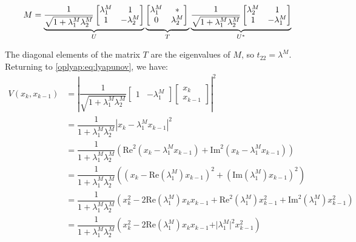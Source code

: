 \documentclass[a4paper,11pt]{article}
\begin{document}
\begin{equation}
 \label{oplyap:eq:schur_decomposition_ex}
 M = 
\underbrace{\dfrac{1}{\sqrt{1 + \lambda^M_1\lambda^M_2}}\begin{bmatrix} \lambda^M_1 & 1 \\ 1 & -\lambda^M_2 \end{bmatrix} }_{U}
\underbrace{\begin{bmatrix} \lambda^M_1 & * \\ 0 & \lambda^M_2 \end{bmatrix}\vphantom{\dfrac{1}{\sqrt{1 + \lambda^M_1\lambda^M_2}}}}_T
\underbrace{\dfrac{1}{\sqrt{1 + \lambda^M_1\lambda^M_2}}\begin{bmatrix} \lambda^M_2 & 1 \\ 1 & -\lambda^M_1 \end{bmatrix}}_{U^*}
\end{equation}

The diagonal elements of the matrix $T$ are the eigenvalues of $M$, so $t_{22} = \lambda^M$. Returning to \eqref{oplyap:eq:lyapunov}, we have:
\begin{equation}
 \begin{split}
 V(x_{k}, x_{k-1}) &= \left\vert \dfrac{1}{\sqrt{1 + \lambda^M_1\lambda^M_2}}\begin{bmatrix} 1 & -\lambda^M_1 \end{bmatrix} \begin{bmatrix} x_k \\ x_{k-1} \end{bmatrix} \right\vert^2 \\
 &= \dfrac{1}{1 + \lambda^M_1\lambda^M_2} \left\vert x_k - \lambda^M_1 x_{k-1}\right\vert^2 \\
 &= \dfrac{1}{1 + \lambda^M_1\lambda^M_2} \left(\text{Re}^2(x_k - \lambda^M_1 x_{k-1}) + \text{Im}^2(x_k - \lambda^M_1x_{k-1}) \right) \\
 &= \dfrac{1}{1 + \lambda^M_1\lambda^M_2} \left(\left(x_k - \text{Re}(\lambda^M_1) x_{k-1}\right)^2 + \left(\text{Im}( \lambda^M_1) x_{k-1}\right) ^2\right) \\
 &= \dfrac{1}{1 + \lambda^M_1\lambda^M_2} \left(x_k^2 - 2 \text{Re}(\lambda^M_1) x_k x_{k-1} + \text{Re}^2(\lambda^M_1)x_{k-1}^2 + \text{Im}^2( \lambda^M_1) x_{k-1}^2\right) \\
 &= \dfrac{1}{1 + \lambda^M_1\lambda^M_2} \left(x_k^2 - 2 \text{Re}(\lambda^M_1) x_k x_{k-1} + \vert \lambda^M_1\vert^2 x_{k-1}^2\right) \\
 \end{split}
\end{equation}
\end{document}
